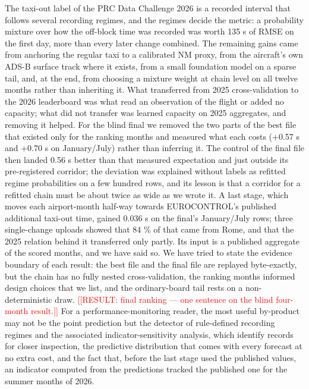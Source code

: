 \documentclass[
  manuscript=article,  %
  layout=preprint,     %
  year=2026,
  volume=4,
]{extra/joas}
\newcommand{\placeholder}[1]{\textcolor{red}{[[RESULT:#1]]}}
\begin{document}
The taxi-out label of the PRC Data Challenge 2026 is a recorded interval that follows several recording regimes, and the regimes decide the metric: a probability mixture over how the off-block time was recorded was worth 135 s of RMSE on the first day, more than every later change combined. The remaining gains came from anchoring the regular taxi to a calibrated NM proxy, from the aircraft's own ADS-B surface track where it exists, from a small foundation model on a sparse tail, and, at the end, from choosing a mixture weight at chain level on all twelve months rather than inheriting it. What transferred from 2025 cross-validation to the 2026 leaderboard was what read an observation of the flight or added no capacity; what did not transfer was learned capacity on 2025 aggregates, and removing it helped. For the blind final we removed the two parts of the best file that existed only for the ranking months and measured what each costs (+0.57 s and +0.70 s on January/July) rather than inferring it. The control of the final file then landed 0.56 s better than that measured expectation and just outside its pre-registered corridor; the deviation was explained without labels as refitted regime probabilities on a few hundred rows, and its lesson is that a corridor for a refitted chain must be about twice as wide as we wrote it. A last stage, which moves each airport-month half-way towards EUROCONTROL's published additional taxi-out time, gained 0.036 s on the final's January/July rows; three single-change uploads showed that 84 \% of that came from Rome, and that the 2025 relation behind it transferred only partly. Its input is a published aggregate of the scored months, and we have said so. We have tried to state the evidence boundary of each result: the best file and the final file are replayed byte-exactly, but the chain has no fully nested cross-validation, the ranking months informed design choices that we list, and the ordinary-board tail rests on a non-deterministic draw. \placeholder{ final ranking --- one sentence on the blind four-month result.} For a performance-monitoring reader, the most useful by-product may not be the point prediction but the detector of rule-defined recording regimes and the associated indicator-sensitivity analysis, which identify records for closer inspection, the predictive distribution that comes with every forecast at no extra cost, and the fact that, before the last stage used the published values, an indicator computed from the predictions tracked the published one for the summer months of 2026.
\end{document}
